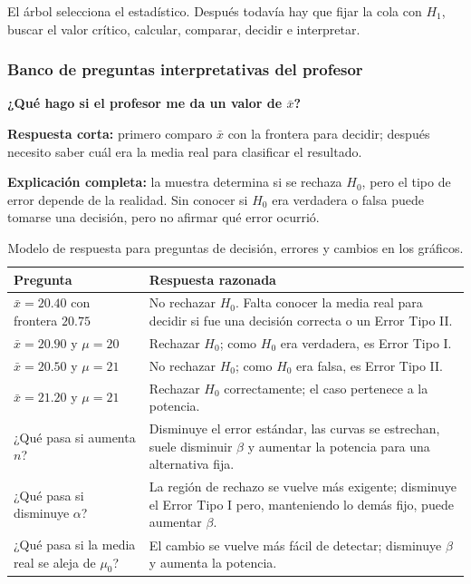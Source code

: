 \documentclass[11pt,a4paper]{article}
\begin{document}
\begin{regla}
El árbol selecciona el estadístico. Después todavía hay que fijar la cola con $H_1$, buscar el valor crítico, calcular, comparar, decidir e interpretar.
\end{regla}

\subsubsection*{Banco de preguntas interpretativas del profesor}

\begin{preguntaoral}
\textbf{¿Qué hago si el profesor me da un valor de $\bar{x}$?}\par
\textbf{Respuesta corta:} primero comparo $\bar{x}$ con la frontera para decidir; después necesito saber cuál era la media real para clasificar el resultado.\par
\textbf{Explicación completa:} la muestra determina si se rechaza $H_0$, pero el tipo de error depende de la realidad. Sin conocer si $H_0$ era verdadera o falsa puede tomarse una decisión, pero no afirmar qué error ocurrió.
\end{preguntaoral}

\begin{table}[H]
\centering
\small
\renewcommand{\arraystretch}{1.25}
\begin{tabularx}{\textwidth}{p{4.4cm}X}
\toprule
Pregunta & Respuesta razonada\\
\midrule
$\bar{x}=20.40$ con frontera $20.75$ & No rechazar $H_0$. Falta conocer la media real para decidir si fue una decisión correcta o un Error Tipo II.\\
$\bar{x}=20.90$ y $\mu=20$ & Rechazar $H_0$; como $H_0$ era verdadera, es Error Tipo I.\\
$\bar{x}=20.50$ y $\mu=21$ & No rechazar $H_0$; como $H_0$ era falsa, es Error Tipo II.\\
$\bar{x}=21.20$ y $\mu=21$ & Rechazar $H_0$ correctamente; el caso pertenece a la potencia.\\
¿Qué pasa si aumenta $n$? & Disminuye el error estándar, las curvas se estrechan, suele disminuir $\beta$ y aumentar la potencia para una alternativa fija.\\
¿Qué pasa si disminuye $\alpha$? & La región de rechazo se vuelve más exigente; disminuye el Error Tipo I pero, manteniendo lo demás fijo, puede aumentar $\beta$.\\
¿Qué pasa si la media real se aleja de $\mu_0$? & El cambio se vuelve más fácil de detectar; disminuye $\beta$ y aumenta la potencia.\\
\bottomrule
\end{tabularx}
\caption{Modelo de respuesta para preguntas de decisión, errores y cambios en los gráficos.}
\end{table}
\end{document}
